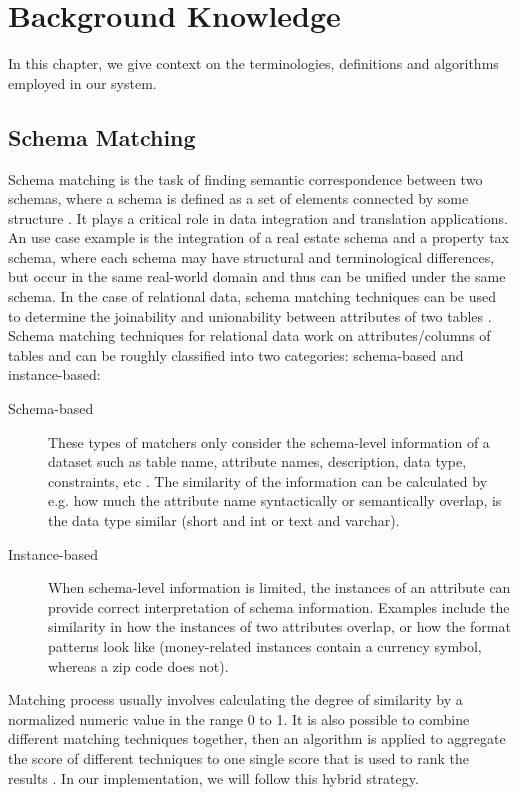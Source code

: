 


\chapter{Background Knowledge}
\label{chap:background}
\pagestyle{plain}

In this chapter, we give context on the terminologies, definitions and algorithms employed in our system.

\section{Schema Matching}\label{schemaMatching}
Schema matching is the task of finding semantic correspondence between two schemas, where a schema is defined as a set of elements connected by some structure \cite{schemaMatching}. It plays a critical role in data integration and translation applications. An use case example is the integration of a real estate schema and a property tax schema, where each schema may have structural and terminological differences, but occur in the same real-world domain and thus can be unified under the same schema. In the case of relational data, schema matching techniques can be used to determine the joinability and unionability between attributes of two tables \cite{valentine}. Schema matching techniques for relational data work on attributes/columns of tables and can be roughly classified into two categories: schema-based and instance-based:

\begin{description}
    \item[Schema-based] These types of matchers only consider the schema-level information of a dataset such as table name, attribute names, description, data type, constraints, etc \cite{cupid}. The similarity of the information can be calculated by e.g. how much the attribute name syntactically or semantically overlap, is the data type similar (short and int or text and varchar).
    \item[Instance-based] When schema-level information is limited, the instances of an attribute can provide correct interpretation of schema information. Examples include the similarity in how the instances of two attributes overlap, or how the format patterns look like (money-related instances contain a currency symbol, whereas a zip code does not).
\end{description}

Matching process usually involves calculating the degree of similarity by a normalized numeric value in the range 0 to 1. It is also possible to combine different matching techniques together, then an algorithm is applied to aggregate the score of different techniques to one single score that is used to rank the results \cite{coma}. In our implementation, we will follow this hybrid strategy.

